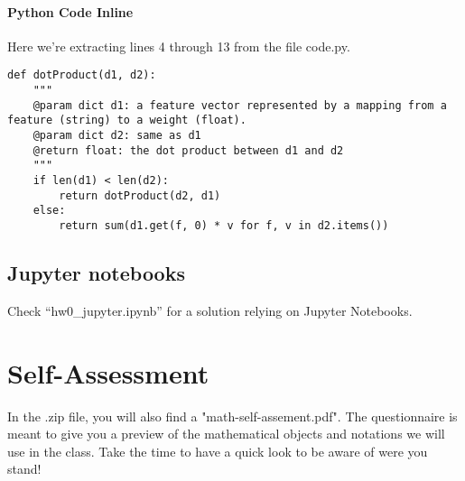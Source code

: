 \documentclass[12pt]{article}
\begin{document}
\paragraph{Python Code Inline}
Here we're extracting lines 4 through 13 from the file code.py.
\begin{verbatim}
def dotProduct(d1, d2):
    """
    @param dict d1: a feature vector represented by a mapping from a feature (string) to a weight (float).
    @param dict d2: same as d1
    @return float: the dot product between d1 and d2
    """
    if len(d1) < len(d2):
        return dotProduct(d2, d1)
    else:
        return sum(d1.get(f, 0) * v for f, v in d2.items())
\end{verbatim}


\subsection{Jupyter notebooks}
Check ``hw0\_jupyter.ipynb'' for a solution relying on Jupyter Notebooks.

\section{Self-Assessment}
In the .zip file, you will also find a "math-self-assement.pdf". The questionnaire is meant to give you a preview of the mathematical objects and notations we will use in the class. Take the time to have a quick look to be aware of were you stand!
\end{document}
